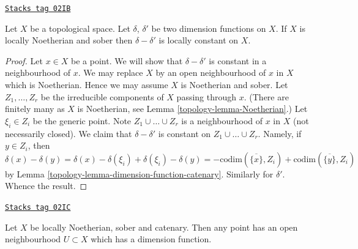\begin{lemma}
\label{topology-lemma-dimension-function-unique}
\href{https://stacks.math.columbia.edu/tag/02IB}{\texttt{Stacks tag 02IB}}

Let $X$ be a topological space.
Let $\delta$, $\delta'$ be two dimension functions on $X$.
If $X$ is locally Noetherian and sober then $\delta - \delta'$ is
locally constant on $X$.
\end{lemma}

\begin{proof}

Let $x \in X$ be a point. We will show that $\delta - \delta'$ is
constant in a neighbourhood of $x$.
We may replace $X$ by an open neighbourhood
of $x$ in $X$ which is Noetherian. Hence we may assume $X$ is
Noetherian and sober.
Let $Z_1, \ldots, Z_r$ be the irreducible
components of $X$ passing through $x$. (There are finitely many as
$X$ is Noetherian, see Lemma \ref{topology-lemma-Noetherian}.)
Let $\xi_i \in Z_i$ be the generic point.
Note $Z_1 \cup \ldots \cup Z_r$ is a neighbourhood of $x$ in $X$
(not necessarily closed). We claim that $\delta - \delta'$ is
constant on $Z_1 \cup \ldots \cup Z_r$. Namely, if $y \in Z_i$,
then
$$
\delta(x) - \delta(y) = \delta(x) - \delta(\xi_i) + \delta(\xi_i) - \delta(y)
= - \text{codim}(\overline{\{x\}}, Z_i)
+ \text{codim}(\overline{\{y\}}, Z_i)
$$
by Lemma \ref{topology-lemma-dimension-function-catenary}.
Similarly for $\delta'$. Whence the result.
\end{proof}

\begin{lemma}
\label{topology-lemma-locally-dimension-function}
\href{https://stacks.math.columbia.edu/tag/02IC}{\texttt{Stacks tag 02IC}}

Let $X$ be locally Noetherian, sober and catenary.
Then any point has an open neighbourhood
$U \subset X$ which has a dimension function.
\end{lemma}

